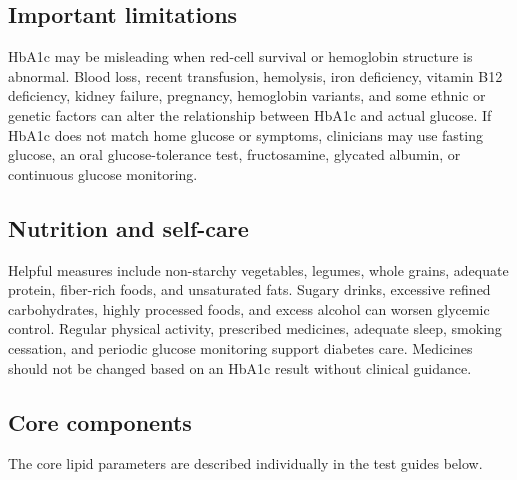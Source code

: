 \documentclass[11pt,openany]{book}
\begin{document}
\subsection*{Important limitations}
HbA1c may be misleading when red-cell survival or hemoglobin structure is
abnormal. Blood loss, recent transfusion, hemolysis, iron deficiency, vitamin
B12 deficiency, kidney failure, pregnancy, hemoglobin variants, and some ethnic
or genetic factors can alter the relationship between HbA1c and actual glucose.
If HbA1c does not match home glucose or symptoms, clinicians may use fasting
glucose, an oral glucose-tolerance test, fructosamine, glycated albumin, or
continuous glucose monitoring.

\subsection*{Nutrition and self-care}
Helpful measures include non-starchy vegetables, legumes, whole grains,
adequate protein, fiber-rich foods, and unsaturated fats. Sugary drinks,
excessive refined carbohydrates, highly processed foods, and excess alcohol can
worsen glycemic control. Regular physical activity, prescribed medicines,
adequate sleep, smoking cessation, and periodic glucose monitoring support
diabetes care. Medicines should not be changed based on an HbA1c result without
clinical guidance.

\subsection*{Core components}
The core lipid parameters are described individually in the test guides below.

\end{document}
